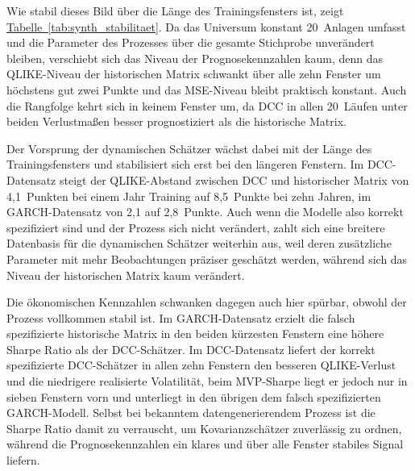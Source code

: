\documentclass[12pt,a4paper]{article}
\begin{document}




Wie stabil dieses Bild über die Länge des Trainingsfensters ist, zeigt \hyperref[tab:synth_stabilitaet]{Tabelle~\ref*{tab:synth_stabilitaet}}.
Da das Universum konstant 20~Anlagen umfasst und die Parameter des Prozesses über die gesamte Stichprobe unverändert bleiben, verschiebt sich das Niveau der Prognosekennzahlen kaum, denn das QLIKE-Niveau der historischen Matrix schwankt über alle zehn Fenster um höchstens gut zwei Punkte und das MSE-Niveau bleibt praktisch konstant.
Auch die Rangfolge kehrt sich in keinem Fenster um, da DCC in allen 20~Läufen unter beiden Verlustmaßen besser prognostiziert als die historische Matrix.

Der Vorsprung der dynamischen Schätzer wächst dabei mit der Länge des Trainingsfensters und stabilisiert sich erst bei den längeren Fenstern.
Im DCC-Datensatz steigt der QLIKE-Abstand zwischen DCC und historischer Matrix von 4,1~Punkten bei einem Jahr Training auf 8,5~Punkte bei zehn Jahren, im GARCH-Datensatz von 2,1 auf 2,8~Punkte.
Auch wenn die Modelle also korrekt spezifiziert sind und der Prozess sich nicht verändert, zahlt sich eine breitere Datenbasis für die dynamischen Schätzer weiterhin aus, weil deren zusätzliche Parameter mit mehr Beobachtungen präziser geschätzt werden, während sich das Niveau der historischen Matrix kaum verändert.



Die ökonomischen Kennzahlen schwanken dagegen auch hier spürbar, obwohl der Prozess vollkommen stabil ist.
Im GARCH-Datensatz erzielt die falsch spezifizierte historische Matrix in den beiden kürzesten Fenstern eine höhere Sharpe Ratio als der DCC-Schätzer.
Im DCC-Datensatz liefert der korrekt spezifizierte DCC-Schätzer in allen zehn Fenstern den besseren QLIKE-Verlust und die niedrigere realisierte Volatilität, beim MVP-Sharpe liegt er jedoch nur in sieben Fenstern vorn und unterliegt in den übrigen dem falsch spezifizierten GARCH-Modell.
Selbst bei bekanntem datengenerierendem Prozess ist die Sharpe Ratio damit zu verrauscht, um Kovarianzschätzer zuverlässig zu ordnen, während die Prognosekennzahlen ein klares und über alle Fenster stabiles Signal liefern.



\printbibliography[title={Literaturverzeichnis}]
\end{document}
